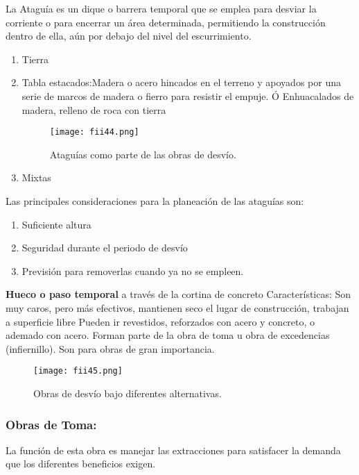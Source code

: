 La Ataguía es un dique o barrera temporal que se emplea para desviar la
corriente o para encerrar un área determinada, permitiendo la construcción dentro de
ella, aún por debajo del nivel del escurrimiento.

\begin{enumerate}
	\item Tierra
	\item Tabla estacados:Madera o acero hincados en el terreno y apoyados por una serie de
	      marcos de madera o fierro para resistir el empuje. Ó Enhuacalados de madera, relleno de roca con tierra
	      \begin{figure}[h!]
		      \centerline{\texttt{[image: fii44.png]}}
		      \caption{Ataguías como parte de las obras de desvío.}
		      \label{fii44}
	      \end{figure}
	\item Mixtas
\end{enumerate}

Las principales consideraciones para la planeación de las ataguías son:

\begin{enumerate}
	\item Suficiente altura
	\item Seguridad durante el periodo de desvío
	\item Previsión para removerlas cuando ya no se empleen.
\end{enumerate}

\textbf{Hueco o paso temporal} a través de la cortina de concreto
Características: Son muy caros, pero más efectivos, mantienen seco el lugar de construcción, trabajan a superficie libre
Pueden ir revestidos, reforzados con acero y concreto, o ademado con  acero. Forman parte de la obra de toma u obra de excedencias (infiernillo). Son para obras de gran importancia.

\begin{figure}[h!]
	\centerline{\texttt{[image: fii45.png]}}
	\caption{Obras de desvío bajo diferentes alternativas.}
	\label{fii45}
\end{figure}



\subsubsection{Obras de Toma:} La función de esta obra es manejar las extracciones para
satisfacer la demanda que los diferentes beneficios exigen.


